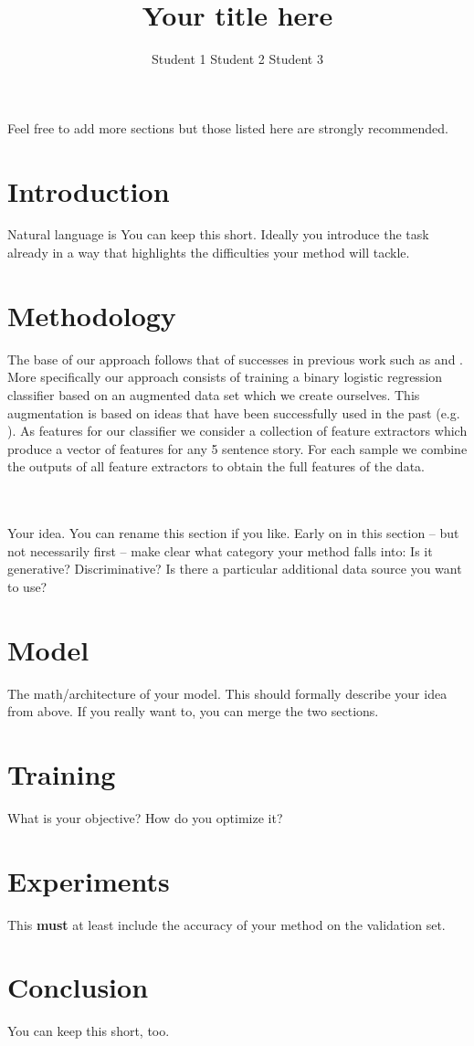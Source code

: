 \documentclass{article}
\title{Your title here}
\author{Student 1 \qquad Student 2 \qquad Student 3}
\begin{document}

\maketitle


Feel free to add more sections but those listed here are strongly recommended.
\section{Introduction}
Natural language is
You can keep this short. Ideally you introduce the task already in a way that highlights the difficulties  your method will tackle.
\section{Methodology}
The base of our approach follows that of successes in previous work such as \cite{UWNLP} and \cite{COGCOMP}. More specifically our approach consists of training a binary logistic regression classifier based on an augmented data set which we create ourselves. This augmentation is based on ideas that have been successfully used in the past (e.g. \cite{LSTMClassifier}). As features for our classifier we consider a collection of feature extractors which produce a vector of features for any 5 sentence story. For each sample we combine the outputs of all feature extractors to obtain the full features of the data.


\\\\
Your idea. You can rename this section if you like. Early on in this section -- but not necessarily first -- make clear what category your method falls into: Is it generative? Discriminative? Is there a particular additional data source you want to use?
\section{Model}
The math/architecture of your model. This should formally describe your idea from above. If you really want to, you can merge the two sections.
\section{Training}
What is your objective? How do you optimize it?

\section{Experiments}
This {\bf must} at least include the accuracy of your method on the validation set.
\section{Conclusion}
You can keep this short, too. \cite{*}



\end{document}
